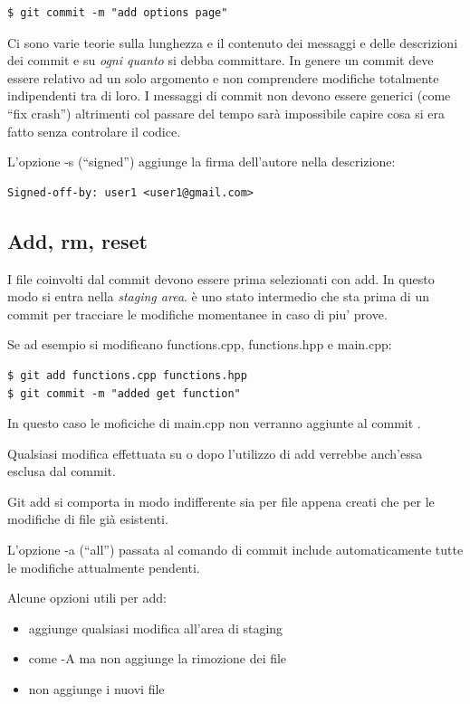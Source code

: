 \documentclass{article} \usepackage[textwidth=18cm,textheight=18cm]{geometry}
\begin{document}
\begin{verbatim}
$ git commit -m "add options page"
\end{verbatim}

Ci sono varie teorie  sulla lunghezza e il contenuto dei messaggi e delle
descrizioni dei commit e su \emph{ogni quanto} si debba committare. In genere un
commit deve essere relativo ad un solo argomento e non comprendere modifiche
totalmente indipendenti tra di loro. I messaggi di commit non devono essere
generici (come ``fix crash'') altrimenti col passare del tempo sarà impossibile
capire cosa si era fatto senza controlare il codice.

L'opzione -s (``signed'') aggiunge la firma dell'autore nella descrizione:

\begin{verbatim}
Signed-off-by: user1 <user1@gmail.com>
\end{verbatim}

\subsection{Add, rm, reset}

I file coinvolti dal commit devono essere prima selezionati con add. In questo
modo si entra nella \textit{staging area}. è uno stato intermedio che sta prima di
un commit per tracciare le modifiche momentanee in caso di piu' prove.

Se ad esempio si modificano functions.cpp, functions.hpp e main.cpp:

\begin{verbatim}
$ git add functions.cpp functions.hpp
$ git commit -m "added get function"
\end{verbatim}

In questo caso le moficiche di main.cpp non verranno aggiunte al commit .

Qualsiasi modifica effettuata su  o  dopo l'utilizzo
di add verrebbe anch'essa esclusa dal commit.

Git add si comporta in modo indifferente sia per file appena creati che per le
modifiche di file già esistenti.

L'opzione -a (``all'') passata al comando di commit include automaticamente tutte
le modifiche attualmente pendenti.

Alcune opzioni utili per add:

\begin{itemize}
    \item {} aggiunge qualsiasi modifica all'area di staging
    \item {} come -A ma non aggiunge la rimozione dei file
    \item {} non aggiunge i nuovi file
\end{itemize}
\end{document}
